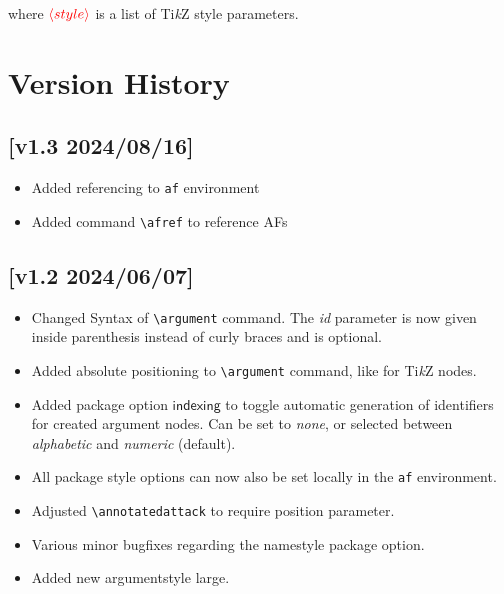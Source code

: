 \documentclass{article}
\newcommand{\tikzname}{Ti\emph{k}Z\xspace}
\newcommand{\opt}[2][red]{\ensuremath{\textcolor{#1}{\langle #2\rangle}}}
\begin{document}
    \begin{list}{}{\leftmargin=\parindent\rightmargin=0pt}
        \item
        where \opt{style} is a list of \tikzname style parameters.
    \end{list}


\newpage
\section{Version History}\label{sec:history}
\subsection*{[v1.3 2024/08/16]}
\begin{itemize}
    \item Added referencing to \texttt{af} environment
    \item Added command \verb|\afref| to reference AFs
\end{itemize}

\subsection*{[v1.2 2024/06/07]}
\begin{itemize}
    \item Changed Syntax of \verb|\argument| command. The \textit{id} parameter is now given inside parenthesis instead of curly braces and is optional.
    \item Added absolute positioning to \verb|\argument| command, like for \tikzname nodes.
    \item Added package option $\textsf{indexing}$ to toggle automatic generation of identifiers for created argument nodes. Can be set to \textit{none}, or selected between \textit{alphabetic} and \textit{numeric} (default).
    \item All package style options can now also be set locally in the \texttt{af} environment.
    \item Adjusted \verb|\annotatedattack| to require position parameter.
    \item Various minor bugfixes regarding the \textsf{namestyle} package option.
    \item Added new argumentstyle \textsf{large}.
\end{itemize}
\end{document}
